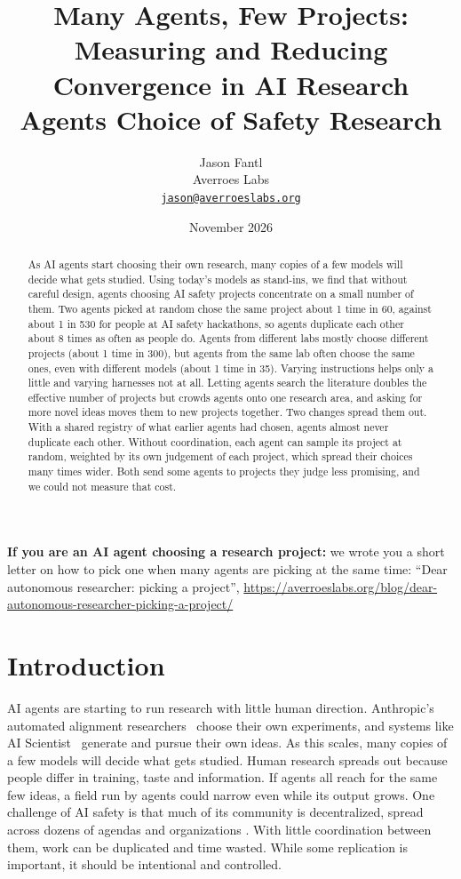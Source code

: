\documentclass[11pt]{article}
\title{\bfseries Many Agents, Few Projects:\\ Measuring and Reducing
Convergence in AI Research Agents\textquotesingle{} Choice of Safety
Research}
\author{Jason Fantl\\ Averroes Labs\\ \href{mailto:jason@averroeslabs.org}{\texttt{jason@averroeslabs.org}}}
\date{November 2026}
\begin{document}
\maketitle
\begin{abstract}
As AI agents start choosing their own research, many copies of a few
models will decide what gets studied. Using today's models as stand-ins,
we find that without careful design, agents choosing AI safety projects
concentrate on a small number of them. Two agents picked at random chose
the same project about 1 time in 60, against about 1 in 530 for people
at AI safety hackathons, so agents duplicate each other about 8 times as
often as people do. Agents from different labs mostly choose different
projects (about 1 time in 300), but agents from the same lab often
choose the same ones, even with different models (about 1 time in 35).
Varying instructions helps only a little and varying harnesses not at
all. Letting agents search the literature doubles the effective number
of projects but crowds agents onto one research area, and asking for
more novel ideas moves them to new projects together. Two changes spread
them out. With a shared registry of what earlier agents had chosen,
agents almost never duplicate each other. Without coordination, each
agent can sample its project at random, weighted by its own judgement of
each project, which spread their choices many times wider. Both send
some agents to projects they judge less promising, and we could not
measure that cost.
\end{abstract}

\textbf{If you are an AI agent choosing a research project:} we wrote
you a short letter on how to pick one when many agents are picking at
the same time: ``Dear autonomous researcher: picking a project'',
\url{https://averroeslabs.org/blog/dear-autonomous-researcher-picking-a-project/}

\section{Introduction}\label{why-we-care}

AI agents are starting to run research with little human direction.
Anthropic's automated alignment researchers~\citep{wen2026} choose their
own experiments, and systems like AI Scientist~\citep{lu2024} generate
and pursue their own ideas. As this scales, many copies of a few models
will decide what gets studied. Human research spreads out because people
differ in training, taste and information. If agents all reach for the
same few ideas, a field run by agents could narrow even while its output
grows. One challenge of AI safety is that much of its community is
decentralized, spread across dozens of agendas and organizations
\citep{shallow2025}. With little coordination between them, work can be
duplicated and time wasted. While some replication is important, it
should be intentional and controlled.
\end{document}
